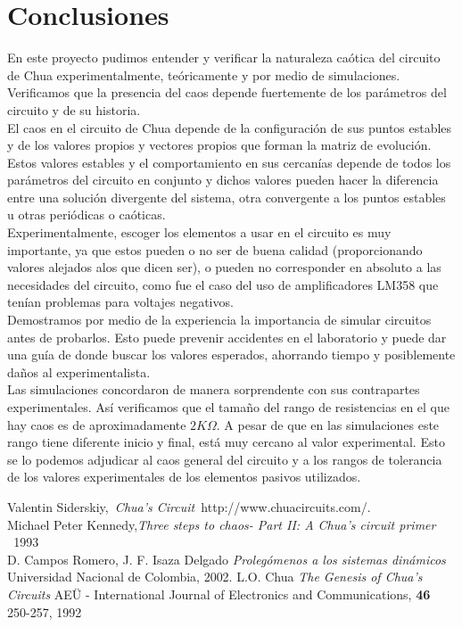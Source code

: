 \documentclass[%
 reprint,
 amsmath,amssymb,
 aps,
]{revtex4-1}
\begin{document}
\section{\label{sec:level1}Conclusiones}
En este proyecto pudimos entender y verificar la naturaleza caótica del circuito de Chua experimentalmente, teóricamente y por medio de simulaciones. Verificamos que la presencia del caos depende fuertemente de los parámetros del circuito y de su historia.\\

El caos en el circuito de Chua depende de la configuración de sus puntos estables y de los valores propios y vectores propios que forman la matriz de evolución. Estos valores estables y el comportamiento en sus cercanías depende de todos los parámetros del circuito en conjunto y dichos valores pueden hacer la diferencia entre una solución divergente del sistema, otra convergente a los puntos estables u otras periódicas o caóticas.\\

Experimentalmente, escoger los elementos a usar en el circuito es muy importante, ya que estos pueden o no ser de buena calidad (proporcionando valores alejados alos que dicen ser), o pueden no corresponder en absoluto a las necesidades del circuito, como fue el caso del uso de amplificadores LM358 que tenían problemas para voltajes negativos.\\

Demostramos por medio de la experiencia la importancia de simular circuitos antes de probarlos. Esto puede prevenir accidentes en el laboratorio y puede dar una guía de donde buscar los valores esperados, ahorrando tiempo y posiblemente daños al experimentalista.\\

Las simulaciones concordaron de manera sorprendente con sus contrapartes experimentales. Así verificamos que el tamaño del rango de resistencias en el que hay caos es de aproximadamente $2K\Omega$. A pesar de que en las simulaciones este rango tiene diferente inicio y final, está muy cercano al valor experimental. Esto se lo podemos adjudicar al caos general del circuito y a los rangos de tolerancia de los valores experimentales  de los elementos pasivos utilizados.\\


\begin{thebibliography}{99} 
Valentin Siderskiy,{\it \ Chua's Circuit\ }{http://www.chuacircuits.com/}.\\
 Michael Peter Kennedy,{\it Three steps to chaos- Part II: A Chua's circuit primer \ }{1993} \\ 
 D. Campos Romero, J. F. Isaza Delgado \textit{Prolegómenos a los sistemas dinámicos} Universidad Nacional de Colombia, 2002.
 L.O. Chua \textit{The Genesis of Chua's Circuits} AEÜ - International Journal of Electronics and Communications, \textbf{46} 250-257, 1992
\end{thebibliography}
\end{document}
